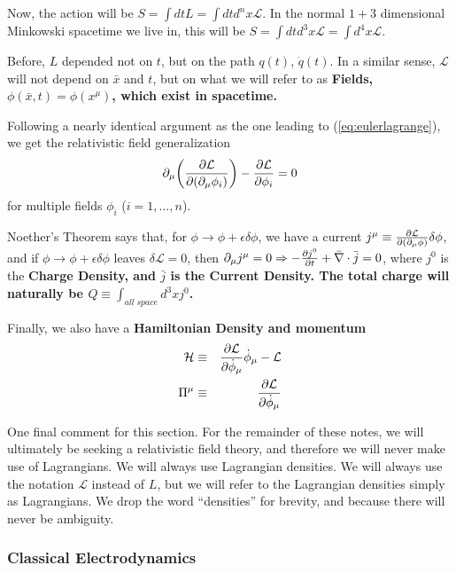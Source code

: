 \documentclass[12pt,epsf]{article}
\def\nolabel{\nonumber }
\def\nolabel{\nonumber }
\begin{document}
Now, the action will be $S = \int dt L = \int dt d^nx \mathcal{L}$.  In
the normal $1+3$ dimensional Minkowski spacetime we live in, this will
be $S = \int dt d^3x\mathcal{L} = \int d^4x \mathcal{L}$.  

Before, $L$ depended not on $t$, but on the path $q(t)$, $\dot{q}(t)$. 
In a similar sense, $\mathcal{L}$ will not depend on $\bar x$ and $t$,
but on what we will refer to as \bf Fields\rm, $\phi(\bar x,t) =
\phi(x^{\mu})$, which exist in spacetime.  

Following a nearly identical argument as the one leading to
(\ref{eq:eulerlagrange}), we get the relativistic field generalization 
\begin{eqnarray}
\partial_{\mu} \bigg({\partial \mathcal{L} \over \partial
(\partial_{\mu} \phi_i)}\bigg) - {\partial \mathcal{L} \over \partial
\phi_i} = 0 \nolabel
\end{eqnarray}
for multiple fields $\phi_i$ ($i=1,\ldots,n$).  

Noether's Theorem says that, for $\phi \rightarrow \phi+\epsilon \delta
\phi$, we have a current $j^{\mu} \equiv {\partial \mathcal{L} \over
\partial (\partial_{\mu}\phi)} \delta \phi$, and if $\phi \rightarrow
\phi + \epsilon \delta \phi$ leaves $\delta \mathcal{L} = 0$, then
$\partial_{\mu}j^{\mu} = 0 \Rightarrow -{\partial j^0 \over \partial t}
+ \bar \nabla \cdot \bar j = 0 $, where $j^0$ is the \bf Charge
Density\rm, and $\bar j$ is the \bf Current Density\rm.  The total
charge will naturally be $Q \equiv \int_{all \; space} d^3xj^0$.  

Finally, we also have a \bf Hamiltonian Density \rm and momentum
\begin{eqnarray}
\mathcal{H} &\equiv& {\partial \mathcal{L} \over \partial
\dot{\phi}_{\mu}} \dot{\phi}_{\mu} - \mathcal{L}
\label{eq:hamiltoniandensity}\\
\Pi^{\mu} &\equiv& {\partial \mathcal{L} \over
\partial\dot{\phi}_{\mu}} \label{eq:momentumdensity}
\end{eqnarray}

One final comment for this section.  For the remainder of these notes,
we will ultimately be seeking a relativistic field theory, and
therefore we will never make use of Lagrangians.  We will always use
Lagrangian densities.  We will always use the notation $\mathcal{L}$
instead of $L$, but we will refer to the Lagrangian densities simply as
Lagrangians.  We drop the word ``densities'' for brevity, and because
there will never be ambiguity.	

\subsubsection{Classical Electrodynamics}
\end{document}
